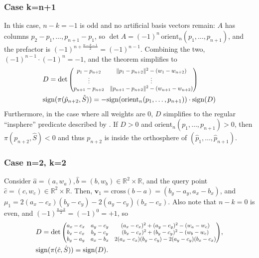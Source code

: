 \documentclass[12pt]{article}
\theoremstyle{definition}
\theoremstyle{remark}
\begin{document}
\subsubsection*{Case k=n+1}\label{sec:insphere-case}
In this case, $n-k = -1$ is odd and no artificial basis vectors remain: $A$ has
columns $p_2 - p_1, \ldots, p_{n+1} - p_1$, so
$\det A = (-1)^n\,\mathrm{orient}_n(p_1, \ldots, p_{n+1})$, and the prefactor is
$(-1)^{n + \frac{n-k-1}{2}} = (-1)^{n-1}$. Combining the two,
$(-1)^{n-1} \cdot (-1)^{n} = -1$, and the theorem simplifies to
\begin{align*}
    &D = \det 
    \scalebox{0.82}{$\begin{pmatrix} 
            p_1 - p_{n+2} & \|p_1 - p_{n+2}\|^2 - (w_1 - w_{n+2}) \\ 
\vdots & \vdots \\ 
p_{n+1} - p_{n+2} & \|p_{n+1} - p_{n+2}\|^2 - (w_{n+1} - w_{n+2}) 
\end{pmatrix}$} \\
    &\mathrm{sign}(\pi(\hat p_{n+2}, \hat S)) = -\mathrm{sign}(\mathrm{orient}_n(p_1, \ldots, p_{n+1})) \cdot \mathrm{sign}(D)
\end{align*}
Furthermore, in the case where all weights are $0$, $D$ simplifies to the regular ``insphere'' predicate described by \cite{shewchuk1997adaptive}. If $D>0$ and $\mathrm{orient}_n \left( p_1, \ldots, p_{n+1}\right) > 0$, then $\pi(p_{n+2}, \hat S) < 0$ and thus $p_{n+2}$ is inside the orthosphere of $(\hat p_1, \ldots, \hat p_{n+1})$.


\subsubsection*{Case n=2, k=2}
Consider $\hat a = (a, w_a), \hat b = (b, w_b) \in \mathbb{R}^2 \times \mathbb{R}$, and the query point $\hat c = (c, w_c) \in \mathbb{R}^2 \times \mathbb{R}$. Then, $\mathbf{v}_1 = \mathrm{cross}(b-a) = (b_y - a_y, a_x - b_x)$, and $\mu_1 = 2(a_x - c_x)(b_y-c_y) - 2(a_y-c_y)(b_x-c_x)$. Also note that $n-k = 0$ is even, and $(-1)^{\frac{n-k}{2}}=(-1)^0=+1$, so 
\begin{align*}
&D = \det 
    \scalebox{0.82}{$\begin{pmatrix} 
            a_x - c_x & a_y - c_y & (a_x-c_x)^2 + (a_y-c_y)^2 - (w_a - w_c) \\
            b_x - c_x & b_y - c_y & (b_x-c_x)^2 + (b_y-c_y)^2 - (w_b - w_c) \\
            b_y - a_y & a_x - b_x & 2(a_x - c_x)(b_y-c_y) - 2(a_y-c_y)(b_x-c_x)
\end{pmatrix}$}, \\
&\mathrm{sign}(\pi(\hat c, \hat S)) =  \mathrm{sign}(D).
\end{align*}
\end{document}
